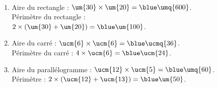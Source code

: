    \ \\ [-5mm]
   \begin{enumerate}
      \item Aire du rectangle : $\um{30}\times\um{20} =\blue \umq{600}$. \\
        Périmètre du rectangle : \\
        $2\times(\um{30}+\um{20}) =\blue \um{100}$.
      \item Aire du carré : $\ucm{6}\times\ucm{6} =\blue \ucmq{36}$. \\
        Périmètre du carré : $4\times\ucm{6} =\blue \ucm{24}$.
     \item Aire du parallélogramme : $\ucm{12}\times\ucm{5} =\blue \umq{60}$. \\
        Périmètre : $2\times(\ucm{12}+\ucm{13}) =\blue \um{50}$.
   \end{enumerate}
